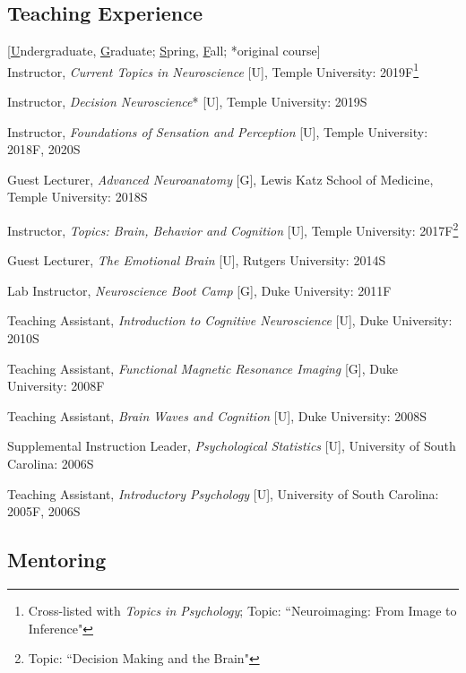 \documentclass[11pt, letterpaper]{article}
\begin{document}
\subsection*{Teaching Experience}

[\underline{U}ndergraduate, \underline{G}raduate; \underline{S}pring, \underline{F}all; *original course] \\ [.2cm]
Instructor, \textit{Current Topics in Neuroscience} [U], Temple University: 2019F\footnote{Cross-listed with \textit{Topics in Psychology}; Topic: ``Neuroimaging: From Image to Inference"}

Instructor, \textit{Decision Neuroscience}* [U], Temple University: 2019S

Instructor, \textit{Foundations of Sensation and Perception} [U], Temple University: 2018F, 2020S

Guest Lecturer, \textit{Advanced Neuroanatomy} [G], Lewis Katz School of Medicine, Temple University: 2018S

Instructor, \textit{Topics: Brain, Behavior and Cognition} [U], Temple University: 2017F\footnote{Topic: ``Decision Making and the Brain"}

Guest Lecturer, \textit{The Emotional Brain} [U], Rutgers University: 2014S

Lab Instructor, \textit{Neuroscience Boot Camp} [G], Duke University: 2011F

Teaching Assistant, \textit{Introduction to Cognitive Neuroscience} [U], Duke University: 2010S

Teaching Assistant, \textit{Functional Magnetic Resonance Imaging} [G], Duke University: 2008F

Teaching Assistant, \textit{Brain Waves and Cognition} [U], Duke University: 2008S

Supplemental Instruction Leader, \textit{Psychological Statistics} [U], University of South Carolina: 2006S

Teaching Assistant, \textit{Introductory Psychology} [U], University of South Carolina: 2005F, 2006S \\



\subsection*{Mentoring}
\end{document}
